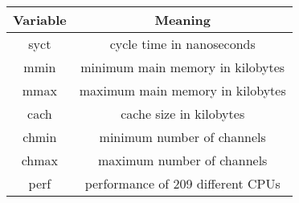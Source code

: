 \documentclass[12pt]{article}
\begin{document}
\begin{figure}[p]

  \centering

  \begin{tabular}{c | c}

    {\bf Variable} & {\bf Meaning} \\ \hline

    syct & cycle time in nanoseconds \\ \hline

    mmin & minimum main memory in kilobytes \\ \hline

    mmax & maximum main memory in kilobytes \\ \hline

    cach & cache size in kilobytes \\ \hline

    chmin & minimum number of channels \\ \hline

    chmax & maximum number of channels \\ \hline

    perf & performance of 209 different CPUs

  \end{tabular}

\end{figure}
\end{document}
